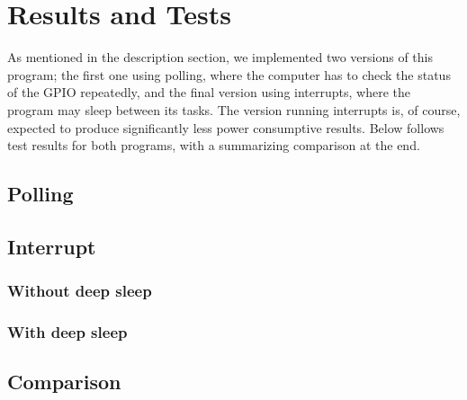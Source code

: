 \section{Results and Tests}

As mentioned in the description section, we implemented two versions of this program; the first one using polling, where the computer has to check the status of the GPIO repeatedly, and the final version using interrupts, where the program may sleep between its tasks. The version running interrupts is, of course, expected to produce significantly less power consumptive results. Below follows test results for both programs, with a summarizing comparison at the end.

\subsection{Polling}

\subsection{Interrupt}

\subsubsection{Without deep sleep}

\subsubsection{With deep sleep}

\subsection{Comparison}
